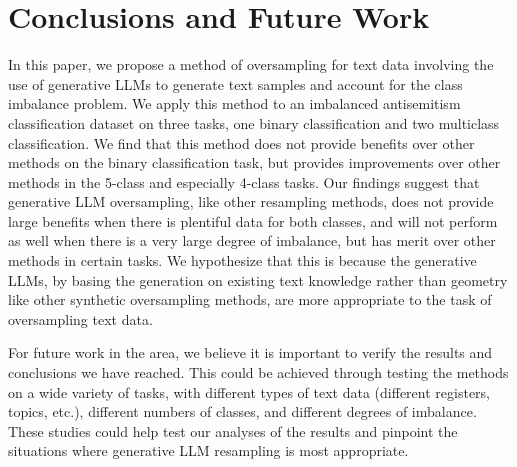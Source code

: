 \documentclass[runningheads]{llncs}
\begin{document}
\section{Conclusions and Future Work}
In this paper, we propose a method of oversampling for text data involving the use of generative LLMs to generate text samples and account for the class imbalance problem. We apply this method to an imbalanced antisemitism classification dataset on three tasks, one binary classification and two multiclass classification. We find that this method does not provide benefits over other methods on the binary classification task, but provides improvements over other methods in the 5-class and especially 4-class tasks. Our findings suggest that generative LLM oversampling, like other resampling methods, does not provide large benefits when there is plentiful data for both classes, and will not perform as well when there is a very large degree of imbalance, but has merit over other methods in certain tasks. We hypothesize that this is because the generative LLMs, by basing the generation on existing text knowledge rather than geometry like other synthetic oversampling methods, are more appropriate to the task of oversampling text data.

For future work in the area, we believe it is important to verify the results and conclusions we have reached. This could be achieved through testing the methods on a wide variety of tasks, with different types of text data (different registers, topics, etc.), different numbers of classes, and different degrees of imbalance. These studies could help test our analyses of the results and pinpoint the situations where generative LLM resampling is most appropriate.
\end{document}
